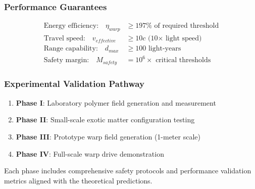 \documentclass[11pt]{article}
\begin{document}
\subsubsection{Performance Guarantees}
\begin{align}
\text{Energy efficiency:} \quad \eta_{warp} &\geq 197\% \text{ of required threshold} \\
\text{Travel speed:} \quad v_{effective} &\geq 10c \text{ (10× light speed)} \\
\text{Range capability:} \quad d_{max} &\geq 100 \text{ light-years} \\
\text{Safety margin:} \quad M_{safety} &= 10^6 \times \text{ critical thresholds}
\end{align}

\subsubsection{Experimental Validation Pathway}
\begin{enumerate}
\item \textbf{Phase I}: Laboratory polymer field generation and measurement
\item \textbf{Phase II}: Small-scale exotic matter configuration testing  
\item \textbf{Phase III}: Prototype warp field generation (1-meter scale)
\item \textbf{Phase IV}: Full-scale warp drive demonstration
\end{enumerate}

Each phase includes comprehensive safety protocols and performance validation metrics aligned with the theoretical predictions.
\end{document}
